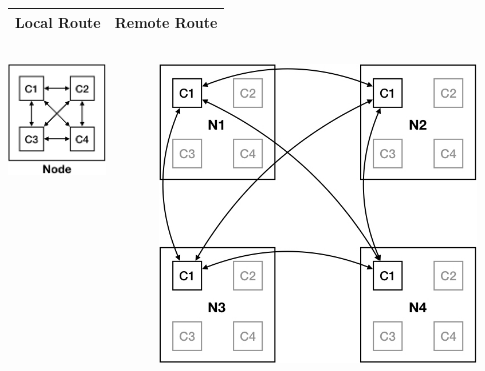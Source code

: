 \documentclass{beamer}
\begin{document}
\begin{frame}
\begin{table}
\begin{tabular}{C|C}
	\hline
	\textbf{Local Route} & \textbf{Remote Route} \\
	\hline
\end{tabular}
\end{table}
\vspace{-1.0em}
%
\begin{columns}
	\begin{column}{0.5\textwidth}
		\begin{center}
			\includegraphics[width=0.75\textwidth]{local}
		\end{center}
	\end{column}
	\begin{column}{0.5\textwidth}  %
		\vspace{-1.5em}
		\begin{center}
			\includegraphics[width=0.9\textwidth]{remote}
		\end{center}
	\end{column}
\end{columns}

\end{frame}
\end{document}
